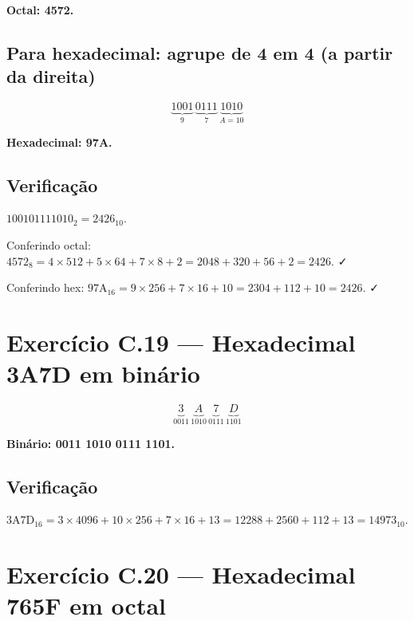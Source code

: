 \documentclass[11pt,a4paper]{article}
\begin{document}
\begin{resposta}\textbf{Octal: 4572.}\end{resposta}

\subsection*{Para hexadecimal: agrupe de 4 em 4 (a partir da direita)}

\[
\underbrace{1001}_{9} \, \underbrace{0111}_{7} \, \underbrace{1010}_{A=10}
\]

\begin{resposta}\textbf{Hexadecimal: 97A.}\end{resposta}

\subsection*{Verifica\c{c}\~ao}

$100101111010_2 = 2426_{10}$.

Conferindo octal: $4572_8 = 4 \times 512 + 5 \times 64 + 7 \times 8 + 2 = 2048 + 320 + 56 + 2 = 2426$. ✓

Conferindo hex: $\text{97A}_{16} = 9 \times 256 + 7 \times 16 + 10 = 2304 + 112 + 10 = 2426$. ✓

\newpage
\section{Exerc\'icio C.19 --- Hexadecimal 3A7D em bin\'ario}

\[
\underbrace{3}_{0011} \, \underbrace{A}_{1010} \, \underbrace{7}_{0111} \, \underbrace{D}_{1101}
\]

\begin{resposta}\textbf{Bin\'ario: 0011 1010 0111 1101.}\end{resposta}

\subsection*{Verifica\c{c}\~ao}

$\text{3A7D}_{16} = 3 \times 4096 + 10 \times 256 + 7 \times 16 + 13 = 12288 + 2560 + 112 + 13 = 14973_{10}$.

\section{Exerc\'icio C.20 --- Hexadecimal 765F em octal}
\end{document}

